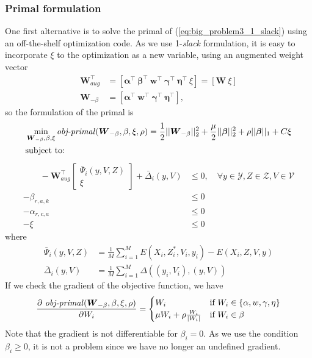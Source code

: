 \documentclass[10pt,letterpaper]{article}
\newcommand{\+}[1]{\ensuremath{{\boldsymbol #1}}}
\begin{document}
\subsubsection{Primal formulation}
One first alternative is to solve the primal of (\ref{eq:big_problem3_1_slack}) using an off-the-shelf optimization code. As we use 1-\emph{slack} formulation, it is easy to incorporate $\xi$ to the optimization as a new variable, using an augmented weight vector
\begin{equation}
\begin{split}
\+W_{aug}^\top & = [\+\alpha^\top ~ \+\beta^\top~\+w^\top~\+\gamma^\top~\+\eta^\top~\xi ] = [\+W~\xi] \\
\+W_{-\beta} & =  [\+\alpha^\top ~\+w^\top~\+\gamma^\top~\+\eta^\top ],
\end{split}
\end{equation}
so the formulation of the primal is
\begin{equation}
\label{PrimalSparse}
\begin{split}
&\min_{\+W_{-\beta},\beta,\xi} \text{\emph{obj-primal}}(\+W_{-\beta},\beta,\xi,\rho ) =  \frac{1}{2} ||\+W_{-\beta}||_2^2 + \frac{\mu}{2}||\+\beta||_2^2 + \rho ||\+\beta||_1 + C\xi \\
&\text{subject to:}\\
\end{split}
\end{equation}
\begin{equation*}
\begin{split} 
 \quad\quad -\+W_{aug}^\top\begin{bmatrix} \bar{\Psi}_i(y,V,Z) \\ \xi \end{bmatrix} + \bar{\Delta}_i(y,V) & \le 0, \quad \forall y \in \mathcal{Y}, Z \in \mathcal{Z}, V \in \mathcal{V} \\
-\beta_{r,a,k} & \le 0 \\
 -\alpha_{r,c,a} & \le 0 \\
 -\xi & \le 0
\end{split}
\end{equation*}
where
\begin{equation}
\begin{split}
\bar{\Psi}_i(y,V,Z) & = \frac{1}{M}\sum_{i=1}^M E(X_i, Z_i^*, V_i, y_i) - E(X_i, Z, V, y) \\
\bar{\Delta}_i(y,V) & = \frac{1}{M}\sum_{i=1}^M\Delta( (y_i, V_i), (y, V))
\end{split}
\end{equation}
If we check the gradient of the objective function, we have
\begin{equation}
\frac{\partial ~\text{\emph{obj-primal}}(\+W_{-\beta},\beta,\xi,\rho )}{\partial W_i} =  \begin{cases}  W_i & \mbox{if } W_i \in \{\alpha,w,\gamma,\eta\} \\ \mu W_i + \rho\frac{W_i}{|W_i|} & \mbox{if } W_i \in{\beta}\end{cases}
\end{equation}
Note that the gradient is not differentiable for $\beta_i = 0$. As we use the condition $\beta_i \ge 0$, it is not a problem since we have no longer an undefined gradient. 
\end{document}
